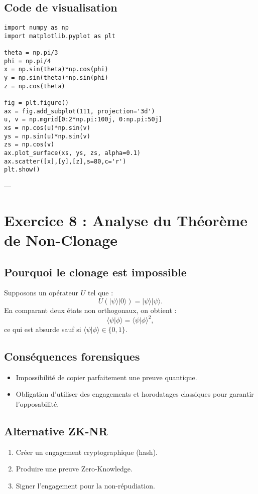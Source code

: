 \documentclass[memoire, 12pt]{report}
\begin{document}
\begin{titlepage}
\subsection*{Code de visualisation}
\begin{lstlisting}[style=python, caption={Représentation d’un état sur la sphère de Bloch}]
import numpy as np
import matplotlib.pyplot as plt

theta = np.pi/3
phi = np.pi/4
x = np.sin(theta)*np.cos(phi)
y = np.sin(theta)*np.sin(phi)
z = np.cos(theta)

fig = plt.figure()
ax = fig.add_subplot(111, projection='3d')
u, v = np.mgrid[0:2*np.pi:100j, 0:np.pi:50j]
xs = np.cos(u)*np.sin(v)
ys = np.sin(u)*np.sin(v)
zs = np.cos(v)
ax.plot_surface(xs, ys, zs, alpha=0.1)
ax.scatter([x],[y],[z],s=80,c='r')
plt.show()
\end{lstlisting}

---

\section*{Exercice 8 : Analyse du Théorème de Non-Clonage}

\subsection*{Pourquoi le clonage est impossible}
Supposons un opérateur $U$ tel que :
\[
U(|\psi\rangle|0\rangle) = |\psi\rangle|\psi\rangle.
\]
En comparant deux états non orthogonaux, on obtient :
\[
\langle \psi | \phi \rangle = \langle \psi | \phi \rangle^2,
\]
ce qui est absurde sauf si $\langle \psi | \phi \rangle \in \{0,1\}$.

\subsection*{Conséquences forensiques}
\begin{itemize}
  \item Impossibilité de copier parfaitement une preuve quantique.
  \item Obligation d’utiliser des engagements et horodatages classiques pour garantir l’opposabilité.
\end{itemize}

\subsection*{Alternative ZK-NR}
\begin{enumerate}
  \item Créer un engagement cryptographique (hash).
  \item Produire une preuve Zero-Knowledge.
  \item Signer l’engagement pour la non-répudiation.
\end{enumerate}


\end{titlepage}
\end{document}
